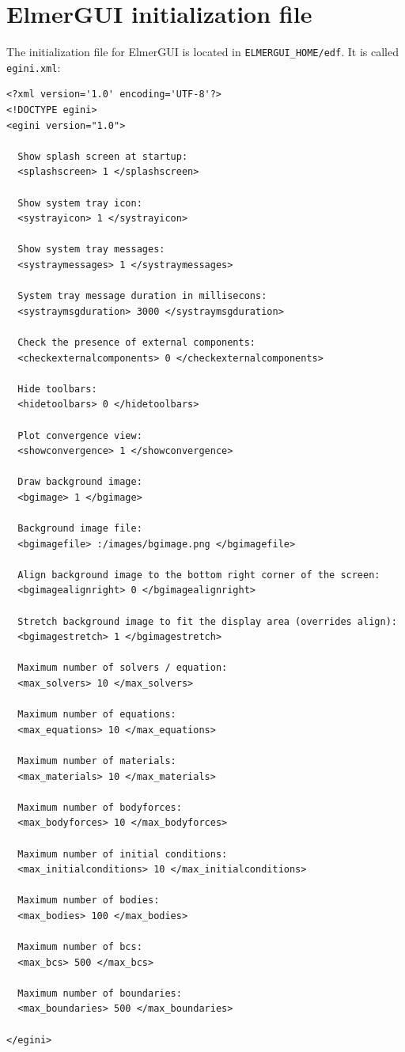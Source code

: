 \documentclass[a4paper,12pt]{article}
\begin{document}



\appendix

\section{ElmerGUI initialization file}

The initialization file for ElmerGUI is located in {\tt ELMERGUI\_HOME/edf}. It is called {\tt egini.xml}:

\begin{footnotesize}
\begin{verbatim}
<?xml version='1.0' encoding='UTF-8'?>
<!DOCTYPE egini>
<egini version="1.0">

  Show splash screen at startup:
  <splashscreen> 1 </splashscreen>

  Show system tray icon:
  <systrayicon> 1 </systrayicon>

  Show system tray messages:
  <systraymessages> 1 </systraymessages>

  System tray message duration in millisecons:
  <systraymsgduration> 3000 </systraymsgduration>

  Check the presence of external components:
  <checkexternalcomponents> 0 </checkexternalcomponents>

  Hide toolbars:
  <hidetoolbars> 0 </hidetoolbars>

  Plot convergence view:
  <showconvergence> 1 </showconvergence>

  Draw background image:
  <bgimage> 1 </bgimage>

  Background image file:
  <bgimagefile> :/images/bgimage.png </bgimagefile>

  Align background image to the bottom right corner of the screen:
  <bgimagealignright> 0 </bgimagealignright>

  Stretch background image to fit the display area (overrides align):
  <bgimagestretch> 1 </bgimagestretch>

  Maximum number of solvers / equation:
  <max_solvers> 10 </max_solvers>

  Maximum number of equations:
  <max_equations> 10 </max_equations>

  Maximum number of materials:
  <max_materials> 10 </max_materials>

  Maximum number of bodyforces:
  <max_bodyforces> 10 </max_bodyforces>

  Maximum number of initial conditions:
  <max_initialconditions> 10 </max_initialconditions>

  Maximum number of bodies:
  <max_bodies> 100 </max_bodies>

  Maximum number of bcs:
  <max_bcs> 500 </max_bcs>

  Maximum number of boundaries:
  <max_boundaries> 500 </max_boundaries>

</egini>
\end{verbatim}
\end{footnotesize}
\end{document}
